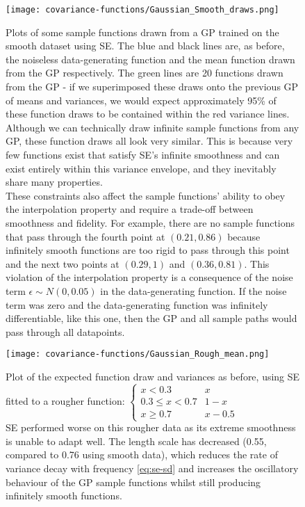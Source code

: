 \begin{figure}[H]
    \texttt{[image: covariance-functions/Gaussian\_Smooth\_draws.png]}
    \caption{
        Plots of some sample functions drawn from a GP trained on the smooth dataset using SE. The blue and black lines are, as before, the noiseless data-generating function and the mean function drawn from the GP respectively. The green lines are 20 functions drawn from the GP - if we superimposed these draws onto the previous GP of means and variances, we would expect approximately 95\% of these function draws to be contained within the red variance lines. \\
        Although we can technically draw infinite sample functions from any GP, these function draws all look very similar. This is because very few functions exist that satisfy SE's infinite smoothness and can exist entirely within this variance envelope, and they inevitably share many properties. \\
        These constraints also affect the sample functions' ability to obey the interpolation property and require a trade-off between smoothness and fidelity. For example, there are no sample functions that pass through the fourth point at $(0.21, 0.86)$ because infinitely smooth functions are too rigid to pass through this point and the next two points at $(0.29, 1)$ and $(0.36, 0.81)$. This violation of the interpolation property is a consequence of the noise term $\epsilon \sim N(0, 0.05)$ in the data-generating function. If the noise term was zero and the data-generating function was infinitely differentiable, like this one, then the GP and all sample paths would pass through all datapoints.
    }
\end{figure}

\begin{figure}[H]
    \texttt{[image: covariance-functions/Gaussian\_Rough\_mean.png]}
    \caption{Plot of the expected function draw and variances as before, using SE fitted to a rougher function:
        $\begin{cases}
                x < 0.3 & x \\
                0.3 \leq x < 0.7 & 1 - x \\
                x \geq 0.7 & x - 0.5
        \end{cases}$\\
        SE performed worse on this rougher data as its extreme smoothness is unable to adapt well. The length scale has decreased (0.55, compared to 0.76 using smooth data), which reduces the rate of variance decay with frequency \ref{eq:se-sd} and increases the oscillatory behaviour of the GP sample functions whilst still producing infinitely smooth functions.
    }
\end{figure}

